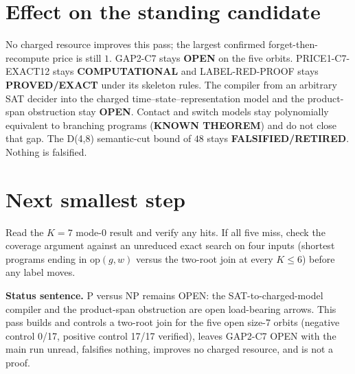 \documentclass[11pt]{article}
\begin{document}
\section*{Effect on the standing candidate}
No charged resource improves this pass; the largest confirmed forget-then-recompute price is still $1$. GAP2-C7 stays \textbf{OPEN} on the five orbits. PRICE1-C7-EXACT12 stays \textbf{COMPUTATIONAL} and LABEL-RED-PROOF stays \textbf{PROVED/EXACT} under its skeleton rules. The compiler from an arbitrary SAT decider into the charged time--state--representation model and the product-span obstruction stay \textbf{OPEN}. Contact and switch models stay polynomially equivalent to branching programs (\textbf{KNOWN THEOREM}) and do not close that gap. The D(4,8) semantic-cut bound of $48$ stays \textbf{FALSIFIED/RETIRED}. Nothing is falsified.

\section*{Next smallest step}
Read the $K=7$ mode-0 result and verify any hits. If all five miss, check the coverage argument against an unreduced exact search on four inputs (shortest programs ending in $\mathrm{op}(g,w)$ versus the two-root join at every $K\le6$) before any label moves.

\bigskip
\noindent\textbf{Status sentence.} P versus NP remains OPEN: the SAT-to-charged-model compiler and the product-span obstruction are open load-bearing arrows. This pass builds and controls a two-root join for the five open size-7 orbits (negative control 0/17, positive control 17/17 verified), leaves GAP2-C7 OPEN with the main run unread, falsifies nothing, improves no charged resource, and is not a proof.
\end{document}
